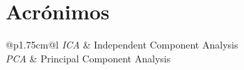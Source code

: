 \chapter*{Acrónimos}

\noindent
\begin{xtabular}{@{}p{1.75cm}@{}l} 
\shrinkheight{-155pt} 
\textsl{ICA} 	& Independent Component Analysis \\
\textsl{PCA} 		& Principal Component Analysis \\
\end{xtabular}
